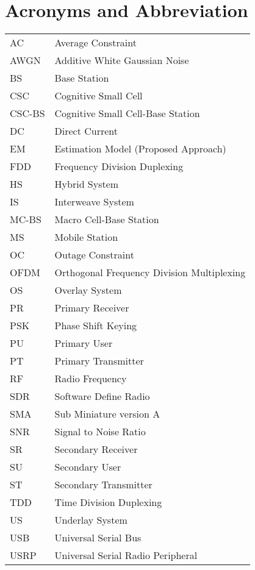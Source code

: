 
\chapter{Acronyms and Abbreviation}
\renewcommand{\arraystretch}{1.4}
\begin{longtable}{p{}p{}}
   	AC 	&	Average Constraint\\
   	AWGN	&	Additive White Gaussian Noise \\
	BS	&	Base Station \\
        CSC 	&	Cognitive Small Cell\\
	CSC-BS	&	Cognitive Small Cell-Base Station \\
	DC 	&	Direct Current \\
  	EM	&	Estimation Model (Proposed Approach) \\
	FDD	& 	Frequency Division Duplexing \\
	HS	& 	Hybrid System \\
	IS	& 	Interweave System \\
	MC-BS	&	Macro Cell-Base Station \\
	MS	&	Mobile Station \\
	OC	&	Outage Constraint \\
	OFDM	&	Orthogonal Frequency Division Multiplexing\\
	OS	&	Overlay System \\
	PR	& 	Primary Receiver \\
	PSK	& 	Phase Shift Keying \\
	PU	& 	Primary User \\
	PT	& 	Primary Transmitter \\
	RF	&	Radio Frequency \\
	SDR 	&	Software Define Radio \\
	SMA 	&	Sub Miniature version A\\
	SNR	&	Signal to Noise Ratio \\
	SR	& 	Secondary Receiver \\
	SU	&	Secondary User \\
	ST	& 	Secondary Transmitter \\
	TDD	& 	Time Division Duplexing \\
	US	&	Underlay System \\
	USB	&	Universal Serial Bus \\
	USRP	&	Universal Serial Radio Peripheral\\


\end{longtable}
